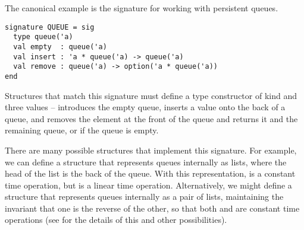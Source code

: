 The canonical example is the signature for working with persistent queues.
\begin{lstlisting}[numbers=none]
signature QUEUE = sig
  type queue('a)
  val empty  : queue('a)
  val insert : 'a * queue('a) -> queue('a)
  val remove : queue('a) -> option('a * queue('a))
end 
\end{lstlisting}
Structures that match this signature must define a type constructor  of kind  and three values --  introduces the empty queue,  inserts a value onto the back of a queue, and  removes the element at the front of the queue and returns it and the remaining queue, or  if the queue is empty.%

There are many possible structures that implement this signature. For example, we can define a structure  that represents queues internally as lists, where the head of the list is the back of the queue. With this representation,  is a constant time operation, but  is a linear time operation. Alternatively, we might define a structure  that represents queues internally as a pair of lists, maintaining the invariant that one is the reverse of the other, so that both  and  are constant time operations (see \cite{harper1997programming} for the details of this and other possibilities). 


